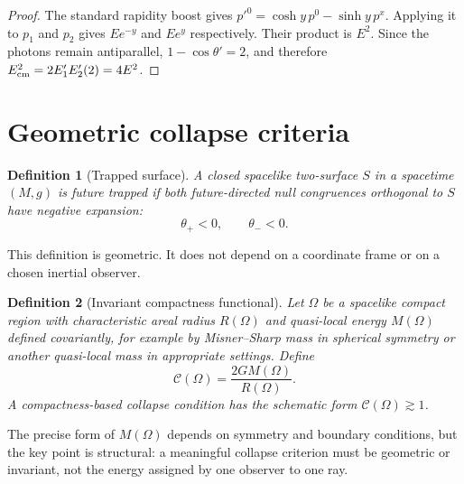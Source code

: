 \documentclass[11pt]{article}
\newtheorem{definition}{Definition}
\theoremstyle{remark}
\begin{document}
\begin{proof}
The standard rapidity boost gives $p'^0=\cosh y\,p^0-\sinh y\,p^x$. Applying it to $p_1$ and $p_2$ gives $E e^{-y}$ and $E e^{y}$ respectively. Their product is $E^2$. Since the photons remain antiparallel, $1-\cos\theta'=2$, and therefore $E_{\rm cm}^2=2E_1'E_2'(2)=4E^2$.
\end{proof}


\section{Geometric collapse criteria}

\begin{definition}[Trapped surface]
A closed spacelike two-surface $S$ in a spacetime $(M,g)$ is future trapped if both future-directed null congruences orthogonal to $S$ have negative expansion:
\begin{equation}
\theta_+<0,\qquad \theta_-<0 .
\end{equation}
\end{definition}

This definition is geometric. It does not depend on a coordinate frame or on a chosen inertial observer.

\begin{definition}[Invariant compactness functional]
Let $\Omega$ be a spacelike compact region with characteristic areal radius $R(\Omega)$ and quasi-local energy $M(\Omega)$ defined covariantly, for example by Misner--Sharp mass in spherical symmetry or another quasi-local mass in appropriate settings. Define
\begin{equation}
\mathcal C(\Omega)=\frac{2G M(\Omega)}{R(\Omega)}.
\end{equation}
A compactness-based collapse condition has the schematic form $\mathcal C(\Omega)\gtrsim1$.
\end{definition}

The precise form of $M(\Omega)$ depends on symmetry and boundary conditions, but the key point is structural: a meaningful collapse criterion must be geometric or invariant, not the energy assigned by one observer to one ray.
\end{document}
